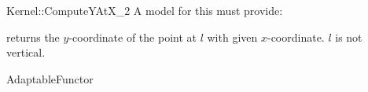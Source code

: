 \begin{ccRefFunctionObjectConcept}{Kernel::ComputeYAtX_2}
A model for this must provide:


       {returns the $y$-coordinate of the point at $l$ with
        given $x$-coordinate.
        \ccPrecond $l$ is not vertical.}

\ccRefines
AdaptableFunctor

\ccSeeAlso
{} \\

\end{ccRefFunctionObjectConcept}
